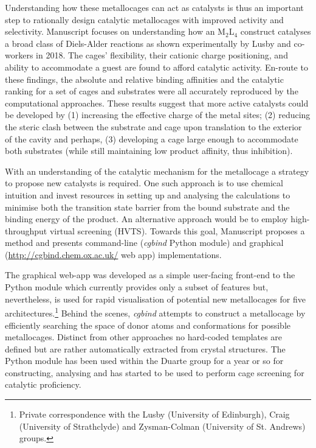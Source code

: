 \documentclass[../../main.tex]{subfiles}
\begin{document}
Understanding how these metallocages can act as catalysts is thus an important step to rationally design catalytic metallocages with improved activity and selectivity. Manuscript  focuses on understanding how an M$_2$L$_4$ construct catalyses a broad class of Diels-Alder reactions as shown experimentally by Lusby and co-workers in 2018.\cite{MartCentelles2018} The cages' flexibility, their cationic charge positioning, and ability to accommodate a guest are found to afford catalytic activity. En-route to these findings, the absolute and relative binding affinities and the catalytic ranking for a set of cages and substrates were all accurately reproduced by the computational approaches. These results suggest that more active catalysts could be developed by (1) increasing the effective charge of the metal sites; (2) reducing the steric clash between the substrate and cage upon translation to the exterior of the cavity and perhaps, (3) developing a cage large enough to accommodate both substrates (while still maintaining low product affinity, thus inhibition).

With an understanding of the catalytic mechanism for the metallocage a strategy to propose new catalysts is required. One such approach is to use chemical intuition and invest resources in setting up and analysing the calculations to minimise both the transition state barrier from the bound substrate and the binding energy of the product. An alternative approach would be to employ high-throughput virtual screening (HVTS). Towards this goal, Manuscript  proposes a method and presents command-line (\emph{cgbind} Python module) and graphical ({\url{http://cgbind.chem.ox.ac.uk/}} web app)  implementations.

The graphical web-app was developed as a simple user-facing front-end to the Python module which currently provides only a subset of features but, nevertheless, is used for rapid visualisation of potential new metallocages for five architectures.\footnote{Private correspondence with the Lusby (University of Edinburgh), Craig (University of Strathclyde) and Zysman-Colman (University of St. Andrews) groups.} Behind the scenes, \emph{cgbind} attempts to construct a metallocage by efficiently searching the space of donor atoms and conformations for possible metallocages. Distinct from other approaches\cite{Turcani2018} no hard-coded templates are defined but are rather automatically extracted from crystal structures. The Python module has been used within the Duarte group for a year or so for constructing, analysing and has started to be used to perform cage screening for catalytic proficiency.

\clearpage
\end{document}
